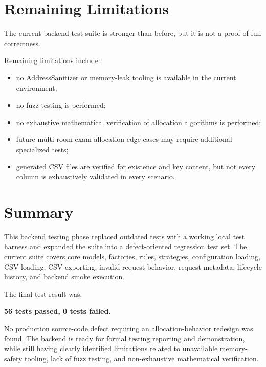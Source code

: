 \documentclass[12pt,a4paper]{article}
\begin{document}
\section{Remaining Limitations}

The current backend test suite is stronger than before, but it is not a proof of full correctness.

Remaining limitations include:

\begin{itemize}
    \item no AddressSanitizer or memory-leak tooling is available in the current environment;
    \item no fuzz testing is performed;
    \item no exhaustive mathematical verification of allocation algorithms is performed;
    \item future multi-room exam allocation edge cases may require additional specialized tests;
    \item generated CSV files are verified for existence and key content, but not every column is exhaustively validated in every scenario.
\end{itemize}

\section{Summary}

This backend testing phase replaced outdated tests with a working local test harness and expanded the suite into a defect-oriented regression test set. The current suite covers core models, factories, rules, strategies, configuration loading, CSV loading, CSV exporting, invalid request behavior, request metadata, lifecycle history, and backend smoke execution.

The final test result was:

\begin{center}
\textbf{56 tests passed, 0 tests failed.}
\end{center}

No production source-code defect requiring an allocation-behavior redesign was found. The backend is ready for formal testing reporting and demonstration, while still having clearly identified limitations related to unavailable memory-safety tooling, lack of fuzz testing, and non-exhaustive mathematical verification.
\end{document}
